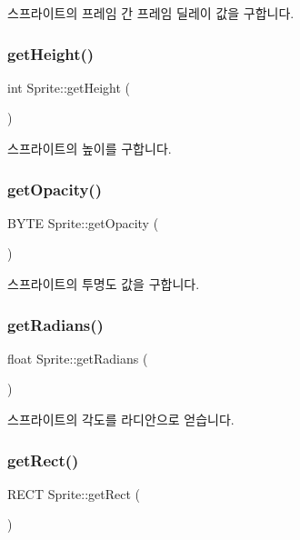 스프라이트의 프레임 간 프레임 딜레이 값을 구합니다. \mbox{\label{class_sprite_a67b67082cfda90103d2d9eefea04cc4b}} 
\subsubsection{\texorpdfstring{getHeight()}{getHeight()}}
{\footnotesize\ttfamily int Sprite\+::get\+Height (\begin{DoxyParamCaption}{ }\end{DoxyParamCaption})}

스프라이트의 높이를 구합니다. \mbox{\label{class_sprite_ae8066ba3778c08cbfa167b9a8f2f52b5}} 
\subsubsection{\texorpdfstring{getOpacity()}{getOpacity()}}
{\footnotesize\ttfamily B\+Y\+TE Sprite\+::get\+Opacity (\begin{DoxyParamCaption}{ }\end{DoxyParamCaption})}

스프라이트의 투명도 값을 구합니다. \mbox{\label{class_sprite_a1b6ffa95774ad477b746d49ac366b5a6}} 
\subsubsection{\texorpdfstring{getRadians()}{getRadians()}}
{\footnotesize\ttfamily float Sprite\+::get\+Radians (\begin{DoxyParamCaption}{ }\end{DoxyParamCaption})}

스프라이트의 각도를 라디안으로 얻습니다. \mbox{\label{class_sprite_a50b0738eb245be70a251e07136e606df}} 
\subsubsection{\texorpdfstring{getRect()}{getRect()}}
{\footnotesize\ttfamily R\+E\+CT Sprite\+::get\+Rect (\begin{DoxyParamCaption}{ }\end{DoxyParamCaption})}

